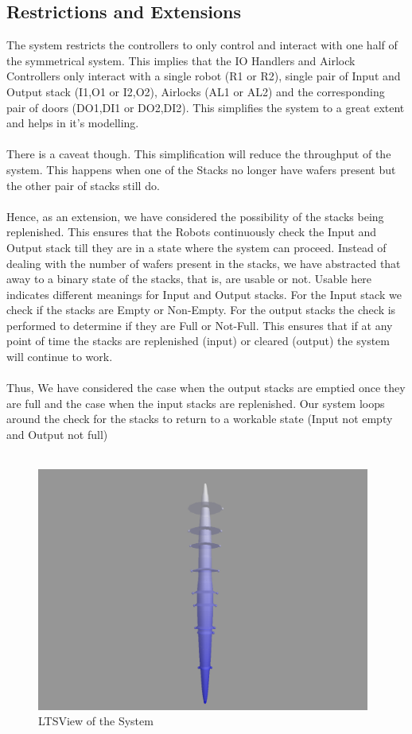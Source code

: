 \documentclass[a4paper,12pt]{article}
\begin{document}
	\subsection{Restrictions and Extensions}
	The system restricts the controllers to only control and interact with one half of the symmetrical system. This implies that the IO Handlers and Airlock Controllers only interact with a single robot (R1 or R2), single pair of Input and Output stack (I1,O1 or I2,O2), Airlocks (AL1 or AL2) and the corresponding pair of doors (DO1,DI1 or DO2,DI2). This simplifies the system to a great extent and helps in it's modelling.
	\\
	\\There is a caveat though. This simplification will reduce the throughput of the system. This happens when one of the Stacks no longer have wafers present but the other pair of stacks still do. 
	\\
	\\Hence, as an extension, we have considered the possibility of the stacks being replenished. This ensures that the Robots continuously check the Input and Output stack till they are in a state where the system can proceed. Instead of dealing with the number of wafers present in the stacks, we have abstracted that away to a binary state of the stacks, that is, are usable or not. Usable here indicates different meanings for Input and Output stacks. For the Input stack we check if the stacks are Empty or Non-Empty. For the output stacks the check is performed to determine if they are Full or Not-Full. This ensures that if at any point of time the stacks are replenished (input) or cleared (output) the system will continue to work. 
	\\
	\\Thus, We have considered the case when the output stacks are emptied once they are full and the case when the input stacks are replenished. Our system loops around the check for the stacks to return to a workable state (Input not empty and Output not full)
	\\
	\\
	\begin{figure}[ht]
		\centering
		\includegraphics[width=\textwidth, height=8cm]{3D-Model.png}
		\caption{LTSView of the System}
		\label{fig:ltsview}
	\end{figure}
	\newpage
\end{document}
